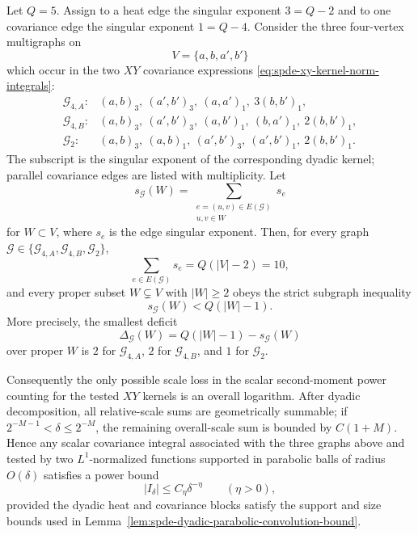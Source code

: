 \begin{proposition}
\label{prop:spde-xy-tested-graph-log-bound}
Let \(Q=5\).  Assign to a heat edge the singular exponent \(3=Q-2\) and to
one covariance edge the singular exponent \(1=Q-4\).  Consider the three
four-vertex multigraphs on
\[
  V=\{a,b,a',b'\}
\]
which occur in the two \(XY\) covariance expressions
\eqref{eq:spde-xy-kernel-norm-integrals}:
\[
\begin{array}{ll}
  \mathcal G_{4,A}:&
  (a,b)_3,\ (a',b')_3,\ (a,a')_1,\ 3(b,b')_1,\\[0.25em]
  \mathcal G_{4,B}:&
  (a,b)_3,\ (a',b')_3,\ (a,b')_1,\ (b,a')_1,\ 2(b,b')_1,\\[0.25em]
  \mathcal G_{2}:&
  (a,b)_3,\ (a,b)_1,\ (a',b')_3,\ (a',b')_1,\ 2(b,b')_1 .
\end{array}
\]
The subscript is the singular exponent of the corresponding dyadic kernel;
parallel covariance edges are listed with multiplicity.  Let
\[
  s_{\mathcal G}(W)
  =
  \sum_{\substack{e=(u,v)\in E(\mathcal G)\\ u,v\in W}}s_e
\]
for \(W\subset V\), where \(s_e\) is the edge singular exponent.  Then,
for every graph \(\mathcal G\in\{\mathcal G_{4,A},\mathcal G_{4,B},
\mathcal G_2\}\),
\begin{equation}
  \sum_{e\in E(\mathcal G)}s_e
  =
  Q(|V|-2)=10 ,
  \label{eq:spde-xy-graph-total-degree}
\end{equation}
and every proper subset \(W\subsetneq V\) with \(|W|\geq2\) obeys the strict
subgraph inequality
\begin{equation}
  s_{\mathcal G}(W)<Q(|W|-1).
  \label{eq:spde-xy-graph-proper-subgraph-degree}
\end{equation}
More precisely, the smallest deficit
\[
  \Delta_{\mathcal G}(W)
  =
  Q(|W|-1)-s_{\mathcal G}(W)
\]
over proper \(W\) is \(2\) for \(\mathcal G_{4,A}\), \(2\) for
\(\mathcal G_{4,B}\), and \(1\) for \(\mathcal G_2\).

Consequently the only possible scale loss in the scalar second-moment power
counting for the tested \(XY\) kernels is an overall logarithm.  After
dyadic decomposition, all relative-scale sums are geometrically summable;
if \(2^{-M-1}<\delta\leq2^{-M}\), the remaining overall-scale sum is bounded
by \(C(1+M)\).  Hence any scalar covariance integral associated with the
three graphs above and tested by two \(L^1\)-normalized functions supported
in parabolic balls of radius \(O(\delta)\) satisfies a power bound
\begin{equation}
  |I_\delta|
  \leq C_\eta \delta^{-\eta}
  \qquad(\eta>0),
  \label{eq:spde-xy-graph-log-loss-bound}
\end{equation}
provided the dyadic heat and covariance blocks satisfy the support and size
bounds used in Lemma~\ref{lem:spde-dyadic-parabolic-convolution-bound}.
\end{proposition}

